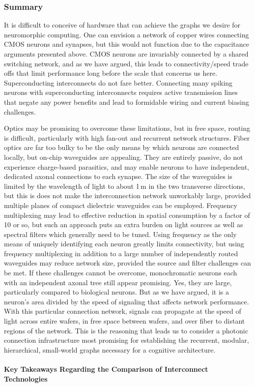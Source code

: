 \subsubsection{Summary}
It is difficult to conceive of hardware that can achieve the graphs we desire for neuromorphic computing. One can envision a network of copper wires connecting CMOS neurons and synapses, but this would not function due to the capacitance arguments presented above. CMOS neurons are invariably connected by a shared switching network, and as we have argued, this leads to connectivity/speed trade offs that limit performance long before the scale that concerns us here. Superconducting interconnects do not fare better. Connecting many spiking neurons with superconducting interconnects requires active transmission lines that negate any power benefits and lead to formidable wiring and current biasing challenges. 

Optics may be promising to overcome these limitations, but in free space, routing is difficult, particularly with high fan-out and recurrent network structures. Fiber optics are far too bulky to be the only means by which neurons are connected locally, but on-chip waveguides are appealing. They are entirely passive, do not experience charge-based parasitics, and may enable neurons to have independent, dedicated axonal connections to each synapse. The size of the waveguides is limited by the wavelength of light to about 1\,\textmu m in the two transverse directions, but this is does not make the interconnection network unworkably large, provided multiple planes of compact dielectric waveguides can be employed. Frequency multiplexing may lead to effective reduction in spatial consumption by a factor of 10 or so, but such an approach puts an extra burden on light sources as well as spectral filters which generally need to be tuned. Using frequency as the only means of uniquely identifying each neuron greatly limits connectivity, but using frequency multiplexing in addition to a large number of independently routed waveguides may reduce network size, provided the source and filter challenges can be met. If these challenges cannot be overcome, monochromatic neurons each with an independent axonal tree still appear promising. Yes, they are large, particularly compared to biological neurons. But as we have argued, it is a neuron's area divided by the speed of signaling that affects network performance. With this particular connection network, signals can propagate at the speed of light across entire wafers, in free space between wafers, and over fiber to distant regions of the network. This is the reasoning that leads us to consider a photonic connection infrastructure most promising for establishing the recurrent, modular, hierarchical, small-world graphs necessary for a cognitive  architecture. 


\paragraph{Key Takeaways Regarding the Comparison of Interconnect Technologies}
